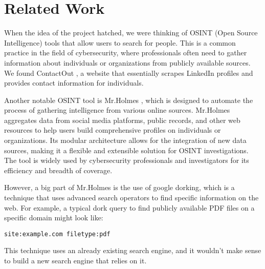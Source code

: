 \section{Related Work}

When the idea of the project hatched, we were thinking of OSINT (Open Source Intelligence) tools that allow users to search for people. This is a common practice in the field of cybersecurity, where professionals often need to gather information about individuals or organizations from publicly available sources. We found ContactOut \cite{contactout}, a website that essentially scrapes LinkedIn profiles and provides contact information for individuals. 

Another notable OSINT tool is Mr.Holmes \cite{mrholmes}, which is designed to automate the process of gathering intelligence from various online sources. Mr.Holmes aggregates data from social media platforms, public records, and other web resources to help users build comprehensive profiles on individuals or organizations. Its modular architecture allows for the integration of new data sources, making it a flexible and extensible solution for OSINT investigations. The tool is widely used by cybersecurity professionals and investigators for its efficiency and breadth of coverage.

However, a big part of Mr.Holmes is the use of google dorking, which is a technique that uses advanced search operators to find specific information on the web. For example, a typical dork query to find publicly available PDF files on a specific domain might look like:
\begin{verbatim}
site:example.com filetype:pdf
\end{verbatim}
This technique uses an already existing search engine, and it wouldn't make sense to build a new search engine that relies on it.


